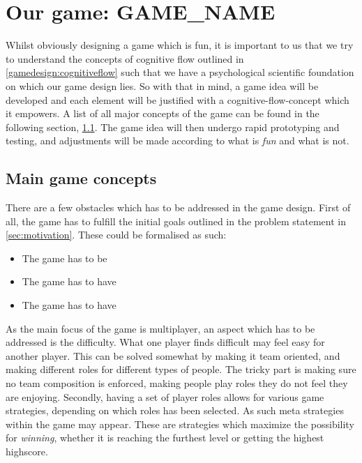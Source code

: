 \section{Our game: GAME_NAME}

Whilst obviously designing a game which is fun, it is important to us that we try to understand the concepts of cognitive flow outlined in \ref{gamedesign:cognitiveflow} such that we have a psychological scientific foundation on which our game design lies. 
So with that in mind, a game idea will be developed and each element will be justified with a cognitive-flow-concept which it empowers. A list of all major concepts of the game can be found in the following section, \ref{gamedesign:maingameconcepts}. 
The game idea will then undergo rapid prototyping and testing, and adjustments will be made according to what is \emph{fun} and what is not.  

\subsection{Main game concepts}\label{gamedesign:maingameconcepts}
There are a few obstacles which has to be addressed in the game design. First of all, the game has to fulfill the initial goals outlined in the problem statement in \ref{sec:motivation}. These could be formalised as such:

\begin{itemize}
\item The game has to be 
\item The game has to have 
\item The game has to have 
\end{itemize}

As the main focus of the game is multiplayer, an aspect which has to be addressed is the difficulty. What one player finds difficult may feel easy for another player. This can be solved somewhat by making it team oriented, and making different roles for different types of people. The tricky part is making sure no team composition is enforced, making people play roles they do not feel they are enjoying. 
Secondly, having a set of player roles allows for various game strategies, depending on which roles has been selected. As such meta strategies within the game may appear. These are strategies which maximize the possibility for \emph{winning}, whether it is reaching the furthest level or getting the highest highscore. 


